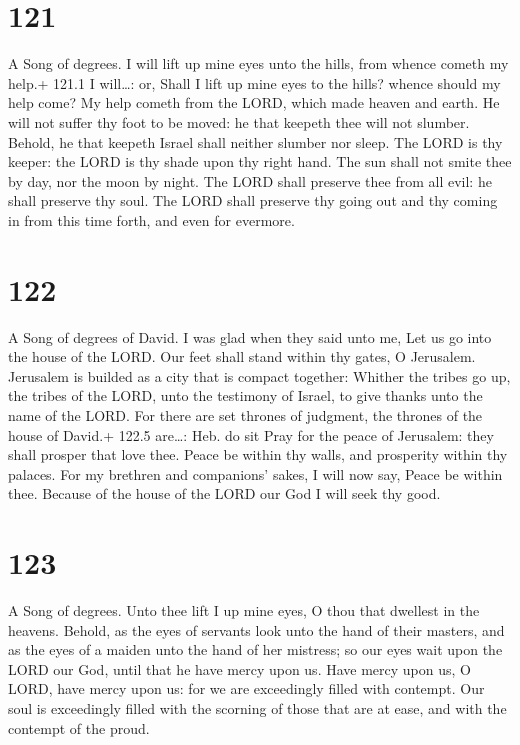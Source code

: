 \hypertarget{section-121}{%
\section{121}\label{section-121}}

A Song of degrees.  I will lift up mine eyes unto the hills,
from whence cometh my help.+ 121.1 I will\ldots: or, Shall I lift up
mine eyes to the hills? whence should my help come?  My help
cometh from the LORD, which made heaven and earth.  He will
not suffer thy foot to be moved: he that keepeth thee will not slumber.
 Behold, he that keepeth Israel shall neither slumber nor
sleep.  The LORD is thy keeper: the LORD is thy shade upon
thy right hand.  The sun shall not smite thee by day, nor
the moon by night.  The LORD shall preserve thee from all
evil: he shall preserve thy soul.  The LORD shall preserve
thy going out and thy coming in from this time forth, and even for
evermore.

\hypertarget{section-122}{%
\section{122}\label{section-122}}

A Song of degrees of David.  I was glad when they said unto
me, Let us go into the house of the LORD.  Our feet shall
stand within thy gates, O Jerusalem.  Jerusalem is builded
as a city that is compact together:  Whither the tribes go
up, the tribes of the LORD, unto the testimony of Israel, to give thanks
unto the name of the LORD.  For there are set thrones of
judgment, the thrones of the house of David.+ 122.5 are\ldots: Heb. do
sit  Pray for the peace of Jerusalem: they shall prosper
that love thee.  Peace be within thy walls, and prosperity
within thy palaces.  For my brethren and companions' sakes,
I will now say, Peace be within thee.  Because of the house
of the LORD our God I will seek thy good.

\hypertarget{section-123}{%
\section{123}\label{section-123}}

A Song of degrees.  Unto thee lift I up mine eyes, O thou
that dwellest in the heavens.  Behold, as the eyes of
servants look unto the hand of their masters, and as the eyes of a
maiden unto the hand of her mistress; so our eyes wait upon the LORD our
God, until that he have mercy upon us.  Have mercy upon us,
O LORD, have mercy upon us: for we are exceedingly filled with contempt.
 Our soul is exceedingly filled with the scorning of those
that are at ease, and with the contempt of the proud.

